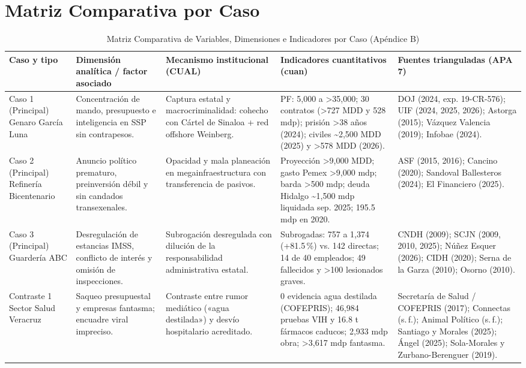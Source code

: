 \documentclass[12pt,letterpaper,oneside]{article}
\begin{document}
\clearpage

\section{Matriz Comparativa por Caso}

\begin{landscape}
\begin{table}[H]
\centering
\caption{Matriz Comparativa de Variables, Dimensiones e Indicadores por Caso (Apéndice B)}
\label{tab:matriz}
\tiny
\begin{tabular}{@{}p{2cm}p{2.5cm}p{3.5cm}p{4cm}p{6.5cm}@{}}
\toprule
\textbf{Caso y tipo} & \textbf{Dimensión analítica / factor asociado} & \textbf{Mecanismo institucional (CUAL)} & \textbf{Indicadores cuantitativos (cuan)} & \textbf{Fuentes trianguladas (APA 7)} \\
\midrule
Caso 1 (Principal) \newline Genaro García Luna & Concentración de mando, presupuesto e inteligencia en SSP sin contrapesos. & Captura estatal y macrocriminalidad: cohecho con Cártel de Sinaloa + red offshore Weinberg. & PF: 5,000 a >35,000; 30 contratos (>727 MDD y 528 mdp); prisión >38 años (2024); civiles \textasciitilde2,500 MDD (2025) y >578 MDD (2026). & DOJ (2024, exp. 19-CR-576); UIF (2024, 2025, 2026); Astorga (2015); Vázquez Valencia (2019); Infobae (2024). \\
\addlinespace
Caso 2 (Principal) \newline Refinería Bicentenario & Anuncio político prematuro, preinversión débil y sin candados transexenales. & Opacidad y mala planeación en megainfraestructura con transferencia de pasivos. & Proyección >9,000 MDD; gasto Pemex >9,000 mdp; barda >500 mdp; deuda Hidalgo \textasciitilde1,500 mdp liquidada sep. 2025; 195.5 mdp en 2020. & ASF (2015, 2016); Cancino (2020); Sandoval Ballesteros (2024); El Financiero (2025). \\
\addlinespace
Caso 3 (Principal) \newline Guardería ABC & Desregulación de estancias IMSS, conflicto de interés y omisión de inspecciones. & Subrogación desregulada con dilución de la responsabilidad administrativa estatal. & Subrogadas: 757 a 1,374 (+81.5\,\%) vs. 142 directas; 14 de 40 empleados; 49 fallecidos y >100 lesionados graves. & CNDH (2009); SCJN (2009, 2010, 2025); Núñez Esquer (2026); CIDH (2020); Serna de la Garza (2010); Osorno (2010). \\
\addlinespace
Contraste 1 \newline Sector Salud Veracruz & Saqueo presupuestal y empresas fantasma; encuadre viral impreciso. & Contraste entre rumor mediático («agua destilada») y desvío hospitalario acreditado. & 0 evidencia agua destilada (COFEPRIS); 46,984 pruebas VIH y 16.8 t fármacos caducos; 2,933 mdp obra; >3,617 mdp fantasma. & Secretaría de Salud / COFEPRIS (2017); Connectas (s.\,f.); Animal Político (s.\,f.); Santiago y Morales (2025); Ángel (2025); Sola-Morales y Zurbano-Berenguer (2019). \\

\end{tabular}
\end{table}
\end{landscape}
\end{document}
